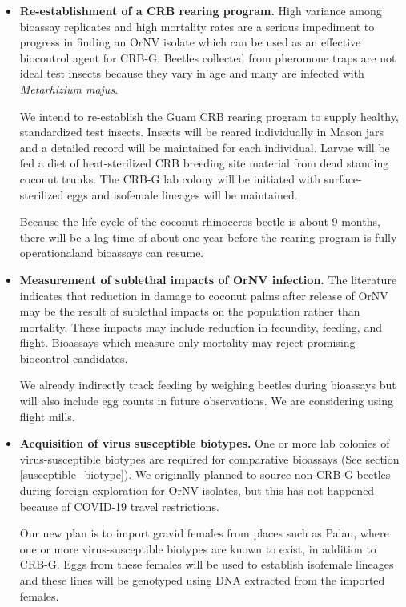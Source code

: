 \documentclass[12pt,letterpaper,english,bibliography=totocnumbered,abstract=on]{scrartcl}
\begin{document}
\begin{itemize}
	\item \textbf{Re-establishment of a CRB rearing program.} High variance among bioassay replicates and high mortality rates are a serious impediment to progress in finding an OrNV isolate which can be used as an effective biocontrol agent for CRB-G. Beetles collected from pheromone traps are not ideal test insects because they vary in age and many are infected with \textit{Metarhizium majus}. 
	
	We intend to re-establish the Guam CRB rearing program to supply healthy, standardized test insects. Insects will be reared individually in Mason jars and a detailed record will be maintained for each individual. Larvae will be fed a diet of heat-sterilized CRB breeding site material from dead standing coconut trunks. The CRB-G lab colony will be initiated with surface-sterilized eggs and isofemale lineages will be maintained.
	
	Because the life cycle of the coconut rhinoceros beetle is about 9 months, there will be a lag time of about one year before the rearing program is fully operationaland bioassays can resume.	
	  
	\item \textbf{Measurement of sublethal impacts of OrNV infection.} The literature indicates that reduction in damage to coconut palms after release of OrNV may be the result of sublethal impacts on the population rather than mortality. These impacts may include reduction in fecundity, feeding, and flight. Bioassays which measure only mortality may reject promising biocontrol candidates.
	
	We already indirectly track feeding by weighing beetles during bioassays but will also include egg counts in future observations. We are considering using flight mills.
	  
	\item \textbf{Acquisition of virus susceptible biotypes.} One or more lab colonies of virus-susceptible biotypes are required for comparative bioassays (See section \ref{susceptible_biotype}). We originally planned to source non-CRB-G beetles during foreign exploration for OrNV isolates, but this has not happened because of COVID-19 travel restrictions. 
	
	Our new plan is to import gravid females from places such as Palau, where one or more virus-susceptible biotypes are known to exist, in addition to CRB-G. Eggs from these females will be used to establish isofemale lineages and these lines will be genotyped using DNA extracted from the imported females.
		
\end{itemize}
\end{document}
